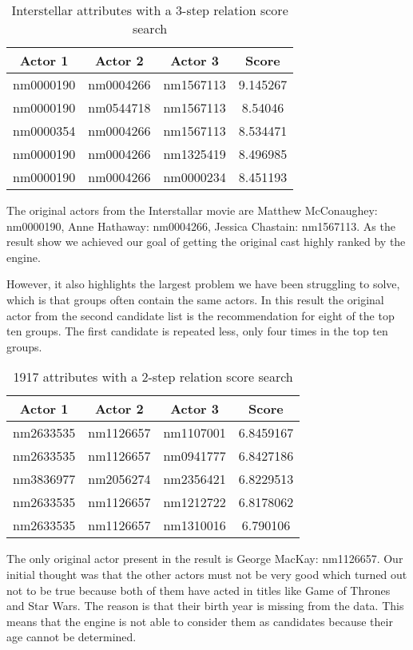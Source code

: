 \begin{table}[H]
\centering
    \begin{tabular}{ |c|c|c|c| } 
        \hline
        \textbf{Actor 1} & \textbf{Actor 2} & \textbf{Actor 3} & \textbf{Score} \\ 
        \hline
        nm0000190 & nm0004266 & nm1567113  & 9.145267 \\ 
        nm0000190 & nm0544718 & nm1567113  & 8.54046 \\ 
        nm0000354 & nm0004266 & nm1567113  & 8.534471 \\ 
        nm0000190 & nm0004266 & nm1325419  & 8.496985 \\ 
        nm0000190 & nm0004266 & nm0000234  & 8.451193 \\ 
        \hline
    \end{tabular}
	\caption{Interstellar attributes with a 3-step relation score search}
	\label{tab:3-step relation score}
\end{table}



The original actors from the Interstallar movie are Matthew McConaughey: nm0000190, Anne Hathaway: nm0004266, Jessica Chastain: nm1567113. As the result show we achieved our goal of getting the original cast highly ranked by the engine.

However, it also highlights the largest problem we have been struggling to solve, which is that groups often contain the same actors. In this result the original actor from the second candidate list is the recommendation for eight of the top ten groups. The first candidate is repeated less, only four times in the top ten groups.



\begin{table}[H]
	\centering
    \begin{tabular}{ |c|c|c|c| } 
        \hline
        \textbf{Actor 1} & \textbf{Actor 2} & \textbf{Actor 3} & \textbf{Score} \\ 
        \hline
        nm2633535 & nm1126657 & nm1107001  & 6.8459167 \\ 
        nm2633535 & nm1126657 & nm0941777  & 6.8427186 \\ 
        nm3836977 & nm2056274 & nm2356421 & 6.8229513 \\ 
        nm2633535 & nm1126657 & nm1212722  & 6.8178062 \\ 
        nm2633535 & nm1126657 & nm1310016  & 6.790106 \\ 
        \hline
    \end{tabular}
\caption{1917 attributes with a 2-step relation score search}
\label{tab:2-step relation score}
\end{table}



The only original actor present in the result is George MacKay: nm1126657. Our initial thought was that the other actors must not be very good which turned out not to be true because both of them have acted in titles like Game of Thrones and Star Wars. The reason is that their birth year is missing from the data. This means that the engine is not able to consider them as candidates because their age cannot be determined.